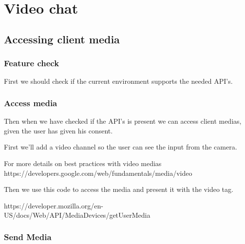

\section{Video chat}

\subsection{Accessing client media}

\subsubsection{Feature check}
First we should check if the current environment supports the needed API's.


\subsubsection{Access media}
Then when we have checked if the API's is present we can access client medias, given the user has given his consent.

First we'll add a video channel so the user can see the input from the camera.

For more details on best practices with video medias https://developers.google.com/web/fundamentals/media/video

Then we use this code to access the media and present it with the video tag.

https://developer.mozilla.org/en-US/docs/Web/API/MediaDevices/getUserMedia

\subsubsection{Send Media}



